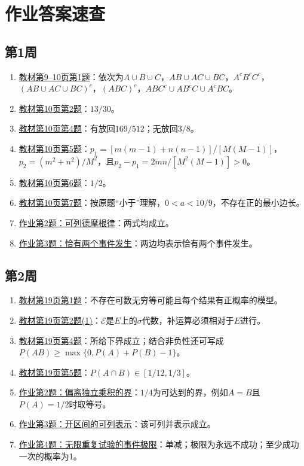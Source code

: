 \section{作业答案速查}
\subsection*{第1周}
\begin{enumerate}
\item \hyperref[ex:w01-t1]{教材第9--10页第1题}：依次为$A\cup B\cup C$，$AB\cup AC\cup BC$，$A^cB^cC^c$，$(AB\cup AC\cup BC)^c$，$(ABC)^c$，$ABC^c\cup AB^cC\cup A^cBC$。
\item \hyperref[ex:w01-t2]{教材第10页第2题}：$13/30$。
\item \hyperref[ex:w01-t4]{教材第10页第4题}：有放回$169/512$；无放回$3/8$。
\item \hyperref[ex:w01-t5]{教材第10页第5题}：$p_1=[m(m-1)+n(n-1)]/[M(M-1)]$，$p_2=(m^2+n^2)/M^2$，且$p_2-p_1=2mn/[M^2(M-1)]>0$。
\item \hyperref[ex:w01-t6]{教材第10页第6题}：$1/2$。
\item \hyperref[ex:w01-t7]{教材第10页第7题}：按原题“小于”理解，$0<a<10/9$，不存在正的最小边长。
\item \hyperref[ex:w01-h2]{作业第2题：可列德摩根律}：两式均成立。
\item \hyperref[ex:w01-h3]{作业第3题：恰有两个事件发生}：两边均表示恰有两个事件发生。
\end{enumerate}
\subsection*{第2周}
\begin{enumerate}
\item \hyperref[ex:w02-t1]{教材第19页第1题}：不存在可数无穷等可能且每个结果有正概率的模型。
\item \hyperref[ex:w02-t2]{教材第19页第2题(1)}：$\mathscr E$是$E$上的$\sigma$代数，补运算必须相对于$E$进行。
\item \hyperref[ex:w02-t4]{教材第19页第4题}：所给下界成立；结合非负性还可写成$P(AB)\geq\max\{0,P(A)+P(B)-1\}$。
\item \hyperref[ex:w02-t5]{教材第19页第5题}：$P(A\cap B)\in[1/12,1/3]$。
\item \hyperref[ex:w02-h2]{作业第2题：偏离独立乘积的界}：$1/4$为可达到的界，例如$A=B$且$P(A)=1/2$时取等号。
\item \hyperref[ex:w02-h3]{作业第3题：开区间的可列表示}：该可列并表示成立。
\item \hyperref[ex:w02-h4]{作业第4题：无限重复试验的事件极限}：单减；极限为永远不成功；至少成功一次的概率为1。
\end{enumerate}
